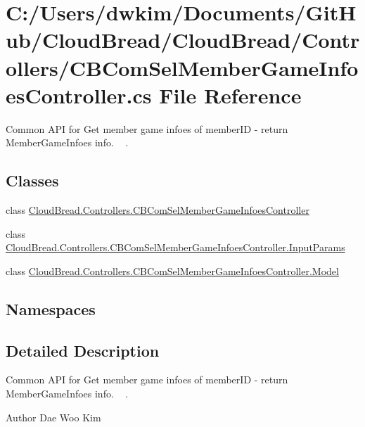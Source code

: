 \hypertarget{a00203}{}\section{C\+:/\+Users/dwkim/\+Documents/\+Git\+Hub/\+Cloud\+Bread/\+Cloud\+Bread/\+Controllers/\+C\+B\+Com\+Sel\+Member\+Game\+Infoes\+Controller.cs File Reference}
\label{a00203}


Common A\+PI for Get member game infoes of member\+ID -\/ return Member\+Game\+Infoes info. ~\newline
.  


\subsection*{Classes}
\begin{DoxyCompactItemize}
\item 
class \hyperlink{a00030}{Cloud\+Bread.\+Controllers.\+C\+B\+Com\+Sel\+Member\+Game\+Infoes\+Controller}
\item 
class \hyperlink{a00103}{Cloud\+Bread.\+Controllers.\+C\+B\+Com\+Sel\+Member\+Game\+Infoes\+Controller.\+Input\+Params}
\item 
class \hyperlink{a00160}{Cloud\+Bread.\+Controllers.\+C\+B\+Com\+Sel\+Member\+Game\+Infoes\+Controller.\+Model}
\end{DoxyCompactItemize}
\subsection*{Namespaces}
\begin{DoxyCompactItemize}
\end{DoxyCompactItemize}


\subsection{Detailed Description}
Common A\+PI for Get member game infoes of member\+ID -\/ return Member\+Game\+Infoes info. ~\newline
. 

\begin{DoxyAuthor}{Author}
Dae Woo Kim 
\end{DoxyAuthor}

